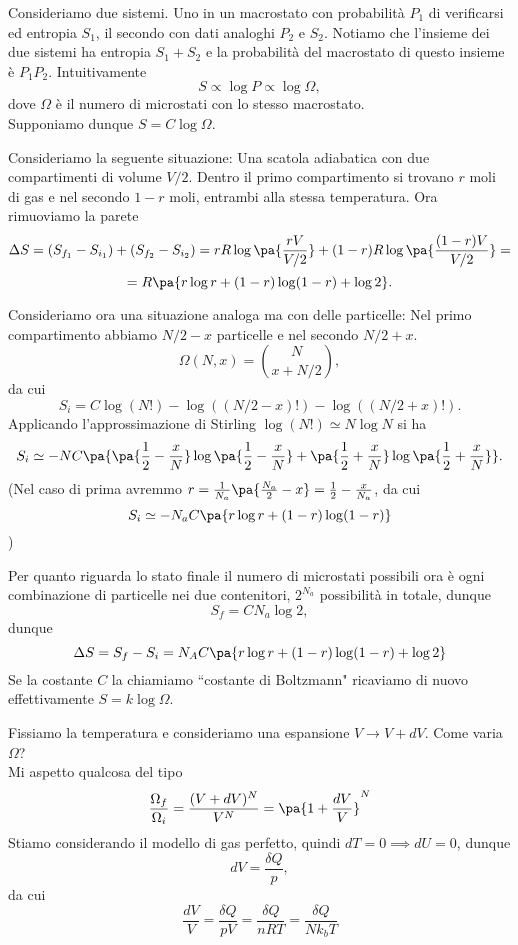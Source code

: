 \begin{remark}
Consideriamo due sistemi. Uno in un macrostato con probabilit\`a $P_1$ di verificarsi ed entropia $S_1$, il secondo con dati analoghi $P_2$ e $S_2$. Notiamo che l'insieme dei due sistemi ha entropia $S_1+S_2$ e la probabilit\`a del macrostato di questo insieme \`e $P_1P_2$. Intuitivamente
\[S\propto \log P\propto \log\Omega,\]
dove $\Omega$ \`e il numero di microstati con lo stesso macrostato.\\
Supponiamo dunque $S=C\log\Omega$.
\end{remark}





Consideriamo la seguente situazione: Una scatola adiabatica con due compartimenti di volume $V/2$. Dentro il primo compartimento si trovano $r$ moli di gas e nel secondo $1-r$ moli, entrambi alla stessa temperatura. Ora rimuoviamo la parete
\[\Delta S=(S_{f_1}-S_{i_1})+(S_{f_2}-S_{i_2})=rR\log\pa{\frac{rV}{V/2}}+(1-r)R\log\pa{\frac{(1-r)V}{V/2}}=\]
\[=R\pa{r\log r+(1-r)\log(1-r)+\log 2}.\]


Consideriamo ora una situazione analoga ma con delle particelle: Nel primo compartimento abbiamo $N/2 -x$ particelle e nel secondo $N/2 +x$.
\[\Omega(N,x)=\binom{N}{x+N/2},\]
da cui
\[S_i=C\log(N!)-\log((N/2-x)!)-\log((N/2+x)!).\]
Applicando l'approssimazione di Stirling $\log(N!)\simeq N\log N$ si ha
\[S_i\simeq -NC\pa{\pa{\frac12-\frac xN}\log\pa{\frac12-\frac xN}+\pa{\frac12+\frac xN}\log\pa{\frac12+\frac xN}}.\]
(Nel caso di prima avremmo $r=\frac1{N_a}\pa{\frac{N_a}2-x}=\frac12-\frac x{N_a}$, da cui
\[S_i\simeq -N_a C\pa{r\log r+(1-r)\log (1-r)}\])

Per quanto riguarda lo stato finale il numero di microstati possibili ora \`e ogni combinazione di particelle nei due contenitori, $2^{N_a}$ possibilit\`a in totale, dunque
\[S_f=CN_a\log 2,\]
dunque
\[\Delta S=S_f-S_i=N_AC\pa{r\log r+(1-r)\log(1-r)+\log 2}\]
Se la costante $C$ la chiamiamo ``costante di Boltzmann" ricaviamo di nuovo effettivamente $S=k\log \Omega$.






Fissiamo la temperatura e consideriamo una espansione $V\to V+dV$. Come varia $\Omega$?\\
Mi aspetto qualcosa del tipo
\[\frac{\Omega_f}{\Omega_i}=\frac{(V+dV)^N}{V^N}=\pa{1+\frac{dV}V}^N\]
Stiamo considerando il modello di gas perfetto, quindi $dT=0\implies dU=0$, dunque
\[dV=\frac{\delta Q}p,\]
da cui
\[\frac{dV}V=\frac{\delta Q}{pV}=\frac{\delta Q}{nRT}=\frac{\delta Q}{Nk_b T}\]


